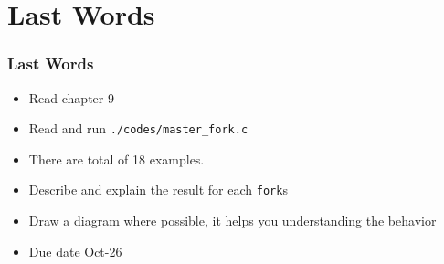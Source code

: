 \documentclass[newPxFont,sthlmFooter,nooffset]{beamer}
\begin{document}
\section{Last Words}

\begin{frame}[t]
  \frametitle{Last Words}
\begin{itemize}
\item Read chapter 9
\item Read and run \texttt{./codes/master\_fork.c}
\item There are total of 18 examples.
\item Describe and explain the result for each \texttt{fork}s
\item Draw a diagram where possible, it helps you understanding the behavior
\item Due date Oct-26
\end{itemize}
\end{frame}
\end{document}
